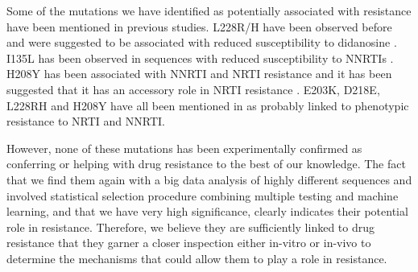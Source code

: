 \documentclass[
  11pt,
  twoside,
  BCOR=10mm,
  listof=totoc]{scrbook}
\begin{document}
Some of the mutations we have identified as potentially associated with
resistance have been mentioned in previous studies. L228R/H have been
observed before \autocite{rheeHIV1SubtypeProtease2007} and were suggested to be
associated with reduced susceptibility to didanosine
\autocite{delucaImprovedInterpretationGenotypic2007,marcelinImpactHIV1Reverse2006}.
I135L has been observed in sequences with reduced susceptibility to
NNRTIs \autocite{brownReducedSusceptibilityHuman2000}. H208Y has been associated
with NNRTI and NRTI resistance \autocite{clarkReverseTranscriptaseMutations2006}
and it has been suggested that it has an accessory role in NRTI
resistance \autocite{nebbiaEmergenceH208YMutation2007}. E203K, D218E, L228RH and
H208Y have all been mentioned in \autocite{saracinoImpactUnreportedHIV12006} as
probably linked to phenotypic resistance to NRTI and NNRTI.

However, none of these mutations has been experimentally confirmed as
conferring or helping with drug resistance to the best of our knowledge.
The fact that we find them again with a big data analysis of highly
different sequences and involved statistical selection procedure
combining multiple testing and machine learning, and that we have very
high significance, clearly indicates their potential role in resistance.
Therefore, we believe they are sufficiently linked to drug resistance
that they garner a closer inspection either in-vitro or in-vivo to
determine the mechanisms that could allow them to play a role in
resistance.
\end{document}
